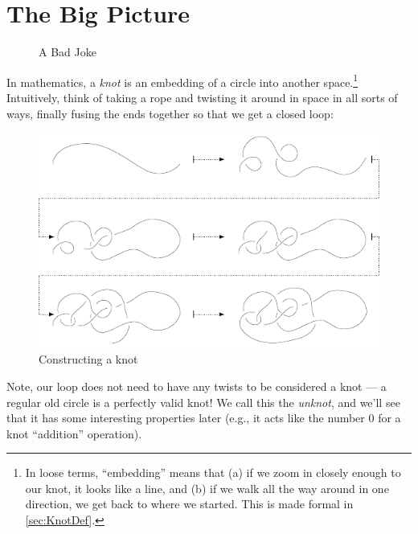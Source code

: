 \section{The Big Picture}
\begin{figure}[H]
  \centering
  \caption{A Bad Joke}
\end{figure}
In mathematics, a \emph{knot} is an embedding of a circle into another
space.\footnote{In loose terms, ``embedding'' means that (a) if we
  zoom in closely enough to our knot, it looks like a line, and (b) if
  we walk all the way around in one direction, we get back to where we
  started. This is made formal in \cref{sec:KnotDef}.} Intuitively,
think of taking a rope and twisting it around in space in all sorts of
ways, finally fusing the ends together so that we get a closed loop:
\begin{figure}[H]
  \centering
  \includegraphics{figures/intro/knotcons.pdf}
  \caption{Constructing a knot}
  \label{fig:knotcons}
\end{figure}
Note, our loop does not need to have any twists to be considered a
knot --- a regular old circle is a perfectly valid knot! We call this
the \emph{unknot}, and we'll see that it has some interesting
properties later (e.g., it acts like the number $0$ for a knot
``addition'' operation).

